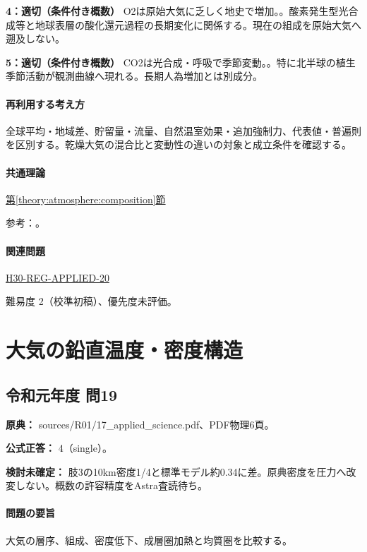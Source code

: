 \noindent\textbf{4：適切（条件付き概数）} O2は原始大気に乏しく地史で増加。。酸素発生型光合成等と地球表層の酸化還元過程の長期変化に関係する。現在の組成を原始大気へ遡及しない。\par

\noindent\textbf{5：適切（条件付き概数）} CO2は光合成・呼吸で季節変動。。特に北半球の植生季節活動が観測曲線へ現れる。長期人為増加とは別成分。\par

\paragraph{再利用する考え方} 全球平均・地域差、貯留量・流量、自然温室効果・追加強制力、代表値・普遍則を区別する。乾燥大気の混合比と変動性の違いの対象と成立条件を確認する。

\paragraph{共通理論} \hyperref[theory:atmosphere:composition]{第\ref*{theory:atmosphere:composition}節}

\par 参考：\cite{atm_noaa_composition,atm_noaa_ghg}。

\paragraph{関連問題} \hyperref[q:h30-reg-applied-20]{H30-REG-APPLIED-20}

\par 難易度 2（校準初稿）、優先度未評価。

\section{大気の鉛直温度・密度構造}

\subsection{令和元年度 問19}
\label{q:r01-reg-applied-19}

\noindent\textbf{原典：} sources/R01/17\_applied\_science.pdf、PDF物理6頁。

\textbf{公式正答：} 4（single）。

\par\textbf{検討未確定：} 肢3の10km密度1/4と標準モデル約0.34に差。原典密度を圧力へ改変しない。概数の許容精度をAstra査読待ち。

\paragraph{問題の要旨} 大気の層序、組成、密度低下、成層圏加熱と均質圏を比較する。

